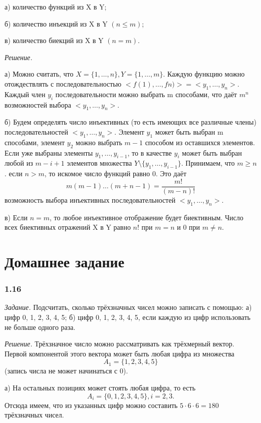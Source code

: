 \documentclass{book}
\begin{document}
а) количество функций из X в Y;

б) количество инъекций из X в Y $\left(n\leq m\right)$;

в) количество биекций из X в Y $\left(n=m\right)$.

\textit{Решение.}

а) Можно считать, что $X=\{1,  \dotsc , n\}, Y=\{1,  \dotsc , m\}$. Каждую функцию можно отождествлять с последовательностью $<f(1),  \dotsc , fn)>=<y_1,  \dotsc , y_n>$. Каждый член $y_i$ последовательности можно выбрать m способами, что даёт $m^n$ возможностей выбора $<y_1,  \dotsc , y_n>$.

б) Будем определять число инъективных (то есть имеющих все различные члены) последовательностей $<y_1,  \dotsc , y_n>$.
Элемент $y_1$ может быть выбран m способами, элемент $y_2$ можно выбрать $m-1$ способом из оставшихся элементов.
Если уже выбраны элементы $y_1,  \dotsc , y_{i-1}$,
то в качестве $y_i$ может быть выбран любой из $m-i+1$ элементов множества
$Y\setminus\{y_1,  \dotsc , y_{i-1}\}$. Принимаем, что $m\geq n$. если $n>m$,
то искомое число функций равно 0.
Это даёт
$$m\left(m-1\right) \dotsc (m+n-1)
=\frac{m!}{\left(m-n\right)!}$$
возможность выбора инъективных последовательностей $<y_1,  \dotsc , y_n>$.

в) Если $n=m$, то любое инъективное отображение будет биективным. Число всех биективных отражений X в Y равно $n!$ при $m=n$ и 0 при $m\neq n$.

\section*{Домашнее задание}

\subsubsection*{1.16}

\textit{Задание.} Подсчитать, сколько трёхзначных чисел можно записать с помощью: а) цифр 0, 1, 2, 3, 4, 5; б) цифр 0, 1, 2, 3, 4, 5, если каждую из цифр использовать не больше одного раза.

\textit{Решение.} Трёхзначное число можно рассматривать как трёхмерный вектор. Первой компонентой этого вектора может быть любая цифра из множества $$A_1=\{1, 2, 3, 4, 5\}$$ (запись числа не может начинаться с 0).

а) На остальных позициях может стоять любая цифра, то есть $$A_i=\{0, 1, 2, 3, 4, 5\}, i=2, 3.$$ Отсюда имеем, что из указанных цифр можно составить $5\cdot 6\cdot 6=180$ трёхзначных чисел.
\end{document}

